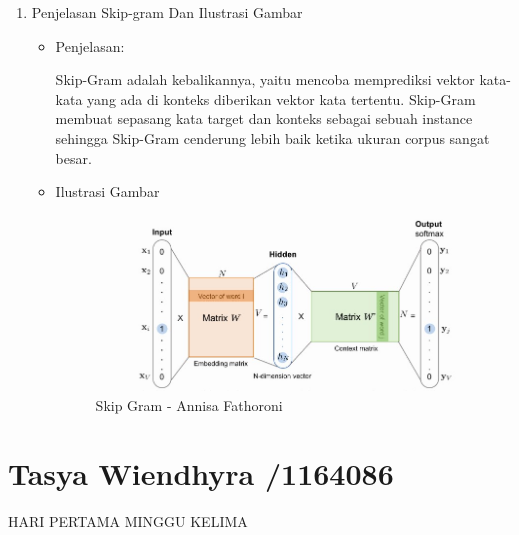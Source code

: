\begin{enumerate}
\begin{itemize}
\end{itemize}

\item Penjelasan Skip-gram Dan Ilustrasi Gambar
\begin{itemize}
\item  Penjelasan:

Skip-Gram adalah kebalikannya, yaitu mencoba memprediksi vektor kata-kata yang ada di konteks diberikan vektor kata tertentu. Skip-Gram membuat sepasang kata target dan konteks sebagai sebuah instance sehingga Skip-Gram cenderung lebih baik ketika ukuran corpus sangat besar. 

\item Ilustrasi Gambar

\begin{figure}[!hbtp]
\centering
\includegraphics[scale=0.5]{figures/Chapter5AnnisaFathoroni1.jpg}
\caption{Skip Gram - Annisa Fathoroni}
\label{Skip Gram - Annisa Fathoroni}
\end{figure}
\par
\par
\end{itemize}
\par
\par
\end{enumerate}


\section{Tasya Wiendhyra /1164086}
HARI PERTAMA MINGGU KELIMA

